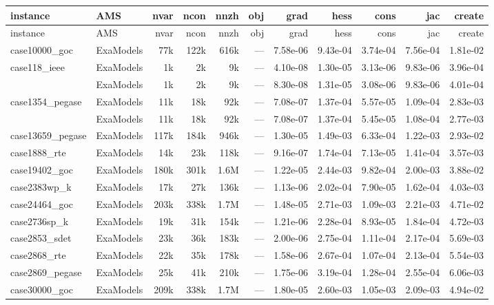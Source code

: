 {\scriptsize
\setlength{\tabcolsep}{4pt}
\begin{longtable}{@{}ll rrr rrr rr r@{}}
  \toprule
  instance & AMS & nvar & ncon & nnzh & obj & grad & hess & cons & jac & create \\
  \midrule
  \endfirsthead
  \toprule
  instance & AMS & nvar & ncon & nnzh & obj & grad & hess & cons & jac & create \\
  \midrule
  \endhead
  case10000\_goc & ExaModels & 77k & 122k & 616k & --- & 7.58e-06 & 9.43e-04 & 3.74e-04 & 7.56e-04 & 1.81e-02 \\
  case118\_ieee & ExaModels & 1k & 2k & 9k & --- & 4.10e-08 & 1.30e-05 & 3.13e-06 & 9.83e-06 & 3.96e-04 \\
   & ExaModels & 1k & 2k & 9k & --- & 8.30e-08 & 1.31e-05 & 3.08e-06 & 9.83e-06 & 4.01e-04 \\
  case1354\_pegase & ExaModels & 11k & 18k & 92k & --- & 7.08e-07 & 1.37e-04 & 5.57e-05 & 1.09e-04 & 2.83e-03 \\
   & ExaModels & 11k & 18k & 92k & --- & 7.08e-07 & 1.37e-04 & 5.45e-05 & 1.08e-04 & 2.77e-03 \\
  case13659\_pegase & ExaModels & 117k & 184k & 946k & --- & 1.30e-05 & 1.49e-03 & 6.33e-04 & 1.22e-03 & 2.93e-02 \\
  case1888\_rte & ExaModels & 14k & 23k & 118k & --- & 9.16e-07 & 1.74e-04 & 7.13e-05 & 1.41e-04 & 3.57e-03 \\
  case19402\_goc & ExaModels & 180k & 301k & 1.6M & --- & 1.22e-05 & 2.44e-03 & 9.82e-04 & 2.00e-03 & 3.88e-02 \\
  case2383wp\_k & ExaModels & 17k & 27k & 136k & --- & 1.13e-06 & 2.02e-04 & 7.90e-05 & 1.62e-04 & 4.03e-03 \\
  case24464\_goc & ExaModels & 203k & 338k & 1.7M & --- & 1.48e-05 & 2.71e-03 & 1.09e-03 & 2.21e-03 & 4.71e-02 \\
  case2736sp\_k & ExaModels & 19k & 31k & 154k & --- & 1.21e-06 & 2.28e-04 & 8.93e-05 & 1.84e-04 & 4.72e-03 \\
  case2853\_sdet & ExaModels & 23k & 36k & 183k & --- & 2.00e-06 & 2.75e-04 & 1.11e-04 & 2.17e-04 & 5.69e-03 \\
  case2868\_rte & ExaModels & 22k & 35k & 178k & --- & 1.58e-06 & 2.67e-04 & 1.07e-04 & 2.13e-04 & 5.54e-03 \\
  case2869\_pegase & ExaModels & 25k & 41k & 210k & --- & 1.75e-06 & 3.19e-04 & 1.28e-04 & 2.55e-04 & 6.06e-03 \\
  case30000\_goc & ExaModels & 209k & 338k & 1.7M & --- & 1.80e-05 & 2.60e-03 & 1.05e-03 & 2.09e-03 & 4.94e-02 \\

\end{longtable}}
